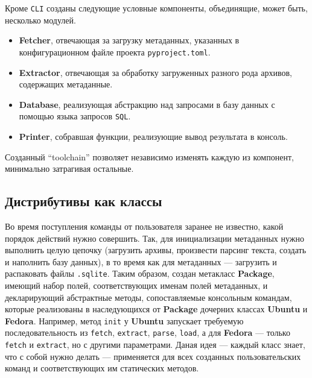 Кроме \texttt{CLI} созданы следующие условные компоненты, объединящие, может быть, несколько модулей.
\begin{itemize}
	\item \textbf{Fetcher}, отвечающая за загрузку метаданных, указанных в конфигурационном файле проекта \texttt{pyproject.toml}.
	\item \textbf{Extractor}, отвечающая за обработку загруженных разного рода архивов, содержащих метаданные.
	\item \textbf{Database}, реализующая абстракцию над запросами в базу данных с помощью языка запросов \texttt{SQL}.
	\item \textbf{Printer}, собравшая функции, реализующие вывод результата в консоль.
\end{itemize}

Созданный \enquote{toolchain} позволяет независимо изменять каждую из компонент, минимально затрагивая остальные.

\subsection{Дистрибутивы как классы}
Во время поступления команды от пользователя заранее не известно, какой порядок действий нужно совершить. Так, для инициализации метаданных {\ubuntu} нужно выполнить целую цепочку (загрузить архивы, произвести парсинг текста, создать и наполнить базу данных), в то время как для метаданных {\fedora} --- загрузить и распаковать файлы \texttt{.sqlite}.
Таким образом, создан метакласс \textbf{Package}, имеющий набор полей, соответствующих именам полей метаданных, и декларирующий абстрактные методы, сопоставляемые консольным командам, которые реализованы в наследующихся от \textbf{Package} дочерних классах \textbf{Ubuntu} и \textbf{Fedora}.
Например, метод \texttt{init} у \textbf{Ubuntu} запускает требуемую последовательность из \texttt{fetch}, \texttt{extract}, \texttt{parse}, \texttt{load}, а для \textbf{Fedora} --- только \texttt{fetch} и \texttt{extract}, но с другими параметрами.
Даная идея --- каждый класс знает, что с собой нужно делать --- применяется для всех созданных пользовательских команд и соответствующих им статических методов.
